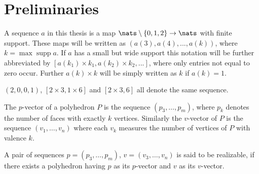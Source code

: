 \section{Preliminaries}

\begin{definition}[Sequence]
  A sequence $a$ in this thesis is a map $\nats \setminus \{0, 1, 2\} \rightarrow \nats$ with finite support. These maps will be written as $(a(3), a(4), ..., a(k))$, where $k = \operatorname{max} \operatorname{supp} a$. If $a$ has a small but wide support this notation will be further abbreviated by $[a(k_1) \times k_1, a(k_2) \times k_2, ...]$, where only entries not equal to zero occur. Further $a(k) \times k$ will be simply written as $k$ if $a(k) = 1$.
\end{definition}
\begin{example}
  $(2, 0, 0, 1)$, $[2 \times 3, 1 \times 6]$ and $[2 \times 3, 6]$ all denote the same sequence.
\end{example}
\begin{definition}\label{def:relizable}
  The $p$-vector of a polyhedron $P$ is the sequence $(p_3, \dots, p_m)$, where $p_k$ denotes the number of faces with exactly $k$ vertices. Similarly the $v$-vector of $P$ is the sequence $(v_1, \dots, v_n)$ where each $v_k$ measures the number of vertices of $P$ with valence $k$.
\end{definition}

\begin{definition}\label{def:realizable}
  A pair of sequences $p = (p_3, \dots, p_m)$, $v = (v_3, \dots, v_n)$ is said to be realizable, if there exists a polyhedron having $p$ as its $p$-vector and $v$ as its $v$-vector.
\end{definition}

